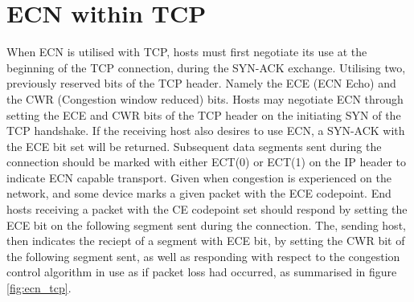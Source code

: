 \documentclass{l4proj}
\begin{document}

\section{ECN within TCP}



When ECN is utilised with TCP, hosts must first negotiate its use at the beginning of the TCP connection, during the SYN-ACK exchange. Utilising two, previously reserved bits of the TCP header. Namely the ECE (ECN Echo) and the CWR (Congestion window reduced) bits. Hosts may negotiate ECN through setting the ECE and CWR bits of the TCP header on the initiating SYN of the TCP handshake. If the receiving host also desires to use ECN, a SYN-ACK with the ECE bit set will be returned. Subsequent data segments sent during the connection should be marked with either ECT(0) or ECT(1) on the IP header to indicate ECN capable transport. Given when congestion is experienced on the network, and some device marks a given packet with the ECE codepoint. End hosts receiving a packet with the CE codepoint set should respond by setting the ECE bit on the following segment sent during the connection. The, sending host, then indicates the reciept of a segment with ECE bit, by setting the CWR bit of the following segment sent, as well as responding with respect to the congestion control algorithm in use as if packet loss had occurred, as summarised in figure \ref{fig:ecn_tcp}.
\end{document}
